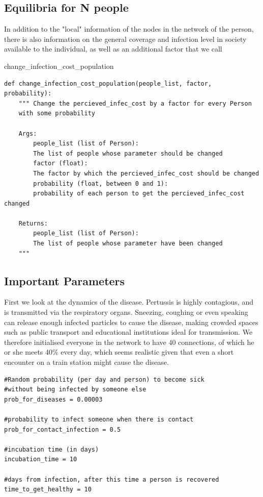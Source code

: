 \documentclass[11pt]{article}
\begin{document}
\subsection{Equilibria for N people}
In addition to the "local" information of the nodes in the network of the person, there is also information on the general coverage and infection level in society available to the individual, as well as an additional factor that we call 

change\_infection\_cost\_population

\begin{small}
\begin{lstlisting}
def change_infection_cost_population(people_list, factor, probability):
    """ Change the percieved_infec_cost by a factor for every Person
    with some probability
    
    Args:
        people_list (list of Person): 
        The list of people whose parameter should be changed
        factor (float): 
        The factor by which the percieved_infec_cost should be changed
        probability (float, between 0 and 1): 
        probability of each person to get the percieved_infec_cost changed
    
    Returns:
        people_list (list of Person): 
        The list of people whose parameter have been changed
    """

\end{lstlisting}
\end{small}


\subsection{Important Parameters}
First we look at the dynamics of the disease. Pertussis is highly contagious, and is transmitted via the respiratory organs. Sneezing, coughing or even speaking can release enough infected particles to cause the disease, making crowded spaces such as public transport and educational institutions ideal for transmission. We therefore initialised everyone in the network to have 40 connections, of which he or she meets 40\% every day, which seems realistic given that even a short encounter on a train station might cause the disease. 
\begin{lstlisting}
#Random probability (per day and person) to become sick 
#without being infected by someone else
prob_for_diseases = 0.00003 

#probability to infect someone when there is contact
prob_for_contact_infection = 0.5 

#incubation time (in days)
incubation_time = 10
 
#days from infection, after this time a person is recovered
time_to_get_healthy = 10 
\end{lstlisting}
\end{document}
